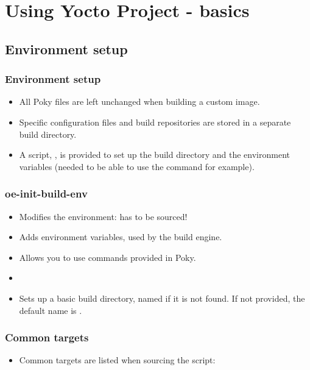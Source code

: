 \section{Using Yocto Project - basics}

\subsection{Environment setup}

\begin{frame}
  \frametitle{Environment setup}
  \begin{itemize}
    \item All Poky files are left unchanged when building a custom
      image.
    \item Specific configuration files and build repositories are
      stored in a separate build directory.
    \item A script, , is provided to set up
      the build directory and the environment variables (needed to be
      able to use the  command for example).
  \end{itemize}
\end{frame}

\begin{frame}
  \frametitle{oe-init-build-env}
  \begin{itemize}
    \item Modifies the environment: has to be sourced!
    \item Adds environment variables, used by the build engine.
    \item Allows you to use commands provided in Poky.
    \item {}
    \item Sets up a basic build directory, named  if it
      is not found. If not provided, the default name is .
  \end{itemize}
\end{frame}

\begin{frame}
  \frametitle{Common targets}
  \begin{itemize}
    \item Common targets are listed when sourcing the script:
  \end{itemize}
\end{frame}

